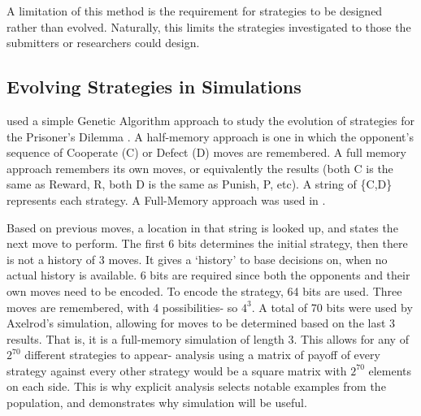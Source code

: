 \documentclass[a4paper,11pt,bcshonoursthesis,singlespace,oneside,thesisdraft,pdflatex]{cssethesis}
\begin{document}
A limitation of this method is the requirement for strategies to be designed rather than evolved. 
Naturally, this limits the strategies investigated to those the submitters or researchers could design.

\subsection{Evolving Strategies in Simulations}
\label{sec:axelrodEvolving}
\citet{axelrod1987evolution} used a simple Genetic Algorithm approach to study the evolution of strategies for the Prisoner's Dilemma \citep{back1997handbook}. A half-memory approach is one in which the opponent's sequence of Cooperate (C) or Defect (D) moves are remembered. A full memory approach remembers its own moves, or equivalently the results (both C is the same as Reward, R, both D is the same as Punish, P, etc). A string of \{C,D\} represents each strategy. A Full-Memory approach was used in \citet{axelrod1987evolution}. 

Based on previous moves, a location in that string is looked up, and states the next move to perform. 
The first 6 bits determines the initial strategy, then there is not a history of 3 moves. 
It gives a `history' to base decisions on, when no actual history is available. 
6 bits are required since both the opponents and their own moves need to be encoded. 
To encode the strategy, 64 bits are used. Three moves are remembered, with 4 possibilities- so $4^3$. 
A total of 70 bits were used by Axelrod's simulation, allowing for moves to be determined based on the last 3 results. That is, it is a full-memory simulation of length 3. 
This allows for any of $2^{70}$ different strategies to appear- analysis using a matrix of payoff of every strategy against every other strategy would be a square matrix with $2^{70}$ elements on each side. 
This is why explicit analysis selects notable examples from the population, and demonstrates why simulation will be useful. 
\end{document}
